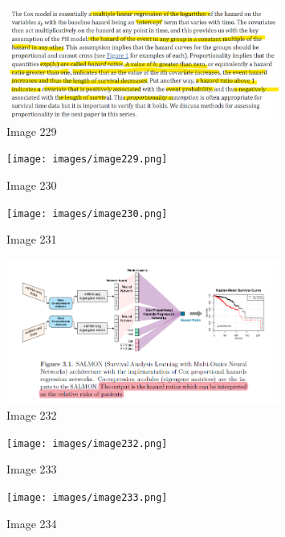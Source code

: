 \documentclass{article}%
\begin{document}
%


\begin{figure}[h!]%
\centering%
\includegraphics[width=0.8\textwidth]{images/image228.png}%
\caption{Image 229}%
\end{figure}

%


\begin{figure}[h!]%
\centering%
\texttt{[image: images/image229.png]}%
\caption{Image 230}%
\end{figure}

%


\begin{figure}[h!]%
\centering%
\texttt{[image: images/image230.png]}%
\caption{Image 231}%
\end{figure}

%


\begin{figure}[h!]%
\centering%
\includegraphics[width=0.8\textwidth]{images/image231.png}%
\caption{Image 232}%
\end{figure}

%


\begin{figure}[h!]%
\centering%
\texttt{[image: images/image232.png]}%
\caption{Image 233}%
\end{figure}

%


\begin{figure}[h!]%
\centering%
\texttt{[image: images/image233.png]}%
\caption{Image 234}%
\end{figure}
\end{document}
